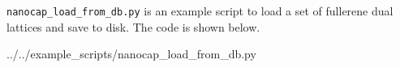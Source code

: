 \verb|nanocap_load_from_db.py| is an example script to load a set of fullerene dual lattices and save to disk. The code is shown below.

%
			{../../example_scripts/nanocap_load_from_db.py}

